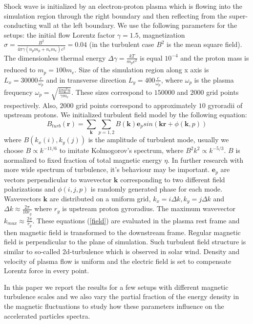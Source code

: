 \documentclass[a4paper]{jpconf}
\begin{document}
Shock wave is initialized by an electron-proton plasma which is flowing into the simulation region through the right boundary and then reflecting from 
the super-conducting wall at the left boundary. We use the following parameters for the setups: the initial flow Lorentz factor $\gamma = 1.5$, magnetization $\sigma = \frac{B^2}{4\pi\gamma (n_p m_p + n_e m_e) c^2} = 0.04$ (in the turbulent case $B^2$ is the mean square field). The dimensionless thermal energy $\Delta \gamma = \frac{k T}{m_p c^2}$ is equal $10^{-4}$ and the proton mass is reduced to $m_p = 100 m_e$. Size of the simulation region along x axis is $L_x = 30000\frac{c}{\omega_p}$ and in transverse direction $L_y = 400\frac{c}{\omega_p}$, where $\omega_p$ is the plasma frequency $\omega_p = \sqrt{\frac{4\pi q^2 n}{\gamma m_e}}$. These sizes correspond to $150000$ and $2000$ grid points respectively. Also, $2000$ grid points correspond to approximately $10$ gyroradii of upstream protons.
We initialized turbulent field model by the following equation: 
\begin{equation}\label{field}
B_{turb} (\textbf{r}) = \sum_{\textbf{k}}\sum_{p=1,2}B(\textbf{k}) \textbf{e}_{p} sin(\textbf{k}\textbf{r}  + \phi (\textbf{k},p))
\end{equation}
where $B(k_x(i),k_y(j))$ is the amplitude of turbulent mode, usually we choose $B \propto k^{-11/6}$ to imitate Kolmogorov's spectrum, where $B^2 k^2 \propto k^{-5/3}$. $B$ is normalized to fixed fraction of total magnetic energy $\eta$. In further research with more wide spectrum of turbulence, it's behaviour may be important. $\textbf{e}_{p}$ are vectors perpendicular to wavevector $\textbf{k}$ corresponding to two different field polarizations and $\phi (i,j,p)$ is randomly generated phase for each mode. Wavevectors $\textbf{k}$ are distributed on a uniform grid, $k_x = i \Delta k, k_y = j \Delta k$ and $\Delta k \approx \frac{2 \pi}{10 r_g}$ where $r_g$ is upstream proton gyroradius. The maximum wavevector $k_{max} \approx \frac{2 \pi}{r_g}$. These equations (\ref{field}) are evaluated in the plasma rest frame and then magnetic field is transformed to the downstream frame. Regular magnetic field is perpendicular to the plane of simulation. Such turbulent field structure is similar to so-called 2d-turbulence which is observed in solar wind\cite{Matthaeus1990}. Density and velocity of plasma flow is uniform and the electric field is set to compensate Lorentz force in every point.

In this paper we report the results for a few setups with different magnetic turbulence scales and we also vary the partial fraction of the energy density 
in the magnetic fluctuations to study how these parameters influence on the accelerated particles spectra.
\end{document}
